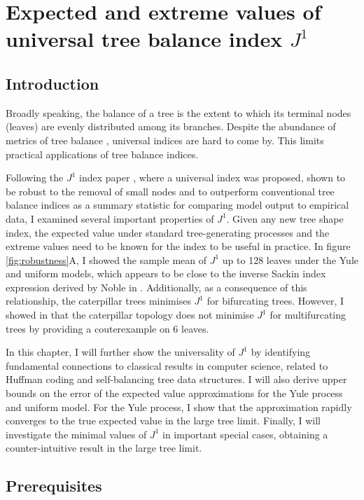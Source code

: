 \chapter{Expected and extreme values of universal tree balance index $J^1$}\label{chapter:trees}


\section{Introduction}
Broadly speaking, the balance of a tree is the extent to which its terminal nodes (leaves)
are evenly distributed among its branches. Despite the abundance of metrics of tree balance
\cite{fischer_tree_2021}, universal indices are hard to come by. This limits practical
applications of tree balance indices. \par
Following the $J^1$ index paper \cite{lemant_robust_2022}, where a universal index was proposed,
shown to be robust to the removal of small nodes and to outperform conventional tree balance
indices as a summary statistic for comparing model output to empirical data, I examined several
important properties of $J^1$. Given any new tree shape index, the expected value under standard
tree-generating processes and the extreme values need to be known for the index to be useful in
practice. In figure \ref{fig:robustness}A, I showed the sample mean of $J^1$ up to 128 leaves
under the Yule and uniform models, which appears to be close to the inverse Sackin index
expression derived by Noble in \cite{lemant_robust_2022}. Additionally, as a consequence of this
relationship, the caterpillar trees minimises $J^1$ for bifurcating trees. However, I showed in
\cite{lemant_robust_2022} that the caterpillar topology does not minimise $J^1$ for multifurcating
trees by providing a couterexample on $6$ leaves. \par
In this chapter, I will further show the universality of $J^1$ by identifying fundamental
connections to classical results in computer science, related to Huffman coding and self-balancing
tree data structures. I will also derive upper bounds on the error of the expected value
approximations for the Yule process and uniform model. For the Yule process, I show that the
approximation rapidly converges to the true expected value in the large tree limit. Finally,
I will investigate the minimal values of $J^1$ in important special cases, obtaining a
counter-intuitive result in the large tree limit.


\section{Prerequisites}


